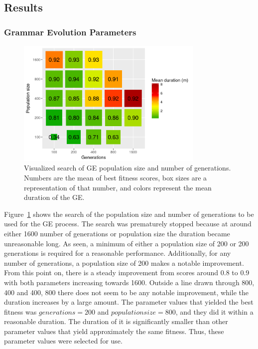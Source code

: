 
\subsection{Results}
\subsubsection{Grammar Evolution Parameters}
\begin{figure}
    \centering
    \includegraphics[width=0.8\textwidth]{figures/ge-size-sampling}
    \caption[Visualized search of GE population size and number of generations]{Visualized search of \gls{GE} population size and number of generations. Numbers are the mean of best fitness scores, box sizes are a representation of that number, and colors represent the mean duration of the \gls{GE}.}
    \label{fig:size-sampling}
\end{figure}

Figure~\ref{fig:size-sampling} shows the search of the population size and number of generations to be used for the \gls{GE} process.
The search was prematurely stopped because at around either 1600 number of generations or population size the duration became unreasonable long.
As seen, a minimum of either a population size of 200 or 200 generations is required for a reasonable performance.
Additionally, for any number of generations, a population size of 200 makes a notable improvement.
From this point on, there is a steady improvement from scores around 0.8 to 0.9 with both parameters increasing towards 1600.
Outside a line drawn through 800, 400 and 400, 800 there does not seem to be any notable improvement, while the duration increases by a large amount.
The parameter values that yielded the best fitness was $generations = 200$ and $population size = 800$, and they did it within a reasonable duration.
The duration of it is significantly smaller than other parameter values that yield approximately the same fitness.
Thus, these parameter values were selected for use.

